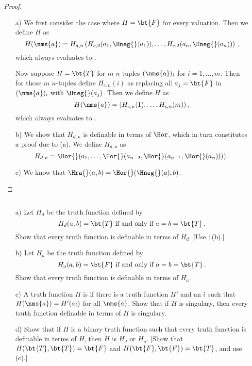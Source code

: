 
\begin{proof}
	\begin{enumerate}
		\item[a)] We first consider the case where $H = \bt{F}$ for 
		every valuation. Then we define $H$ as
		\[
			H(\nms{a}) = H_{d,n} \left( H_{c,2}(a_1,\Hneg{}(a_1)), 
			\dots, H_{c,2}(a_n,\Hneg{}(a_n)) \right)\,,
		\]
		which always evaluates to .
		
		Now suppose $H = \bt{T}$ for $m$ $n$-tuples $(\nms{a})_i$ 
		for $i = 1, \dots, m$. Then for those $m$ $n$-tuples define 
		$H_{c,n}(i)$ as replacing all $a_j = \bt{F}$ in 
		$(\nms{a})_i$ with $\Hneg{}(a_j)$. Then we define $H$ as
		\[
			H(\nms{a}) = (H_{c,n}(1), \dots, H_{c,n}(m))\,,
		\]
		which always evaluates to .
		
		\item[b)] We show that $H_{d,n}$ is definable in terms of 
		$\Hor$, which in turn constitutes a proof due to (a). We 
		define $H_{d,n}$ as
		\[
			H_{d,n} = 
			\Hor{}(a_1, \dots, \Hor{}(a_{n-2},\Hor{}(a_{n-1}, 
			\Hor{}(a_n))))\,.
		\]
		
		\item[c)] We know that $\Hra{}(a,b) = 
		\Hor{}(\Hneg{}(a),b)$.
	\end{enumerate}
\end{proof}


\begin{exercise}
	$ $
	\begin{enumerate}
		\item[a)] Let $H_d$ be the truth function defined by
		\[
			H_d(a,b) = \bt{T} \text{ if and only if } a = b = 
			\bt{T}\,.
		\]
		Show that every truth function is definable in terms of 
		$H_d$. [Use 1(b).]
		
		\item[b)] Let $H_a$ be the truth function defined by
		\[
			H_a(a,b) = \bt{F} \text{ if and only if } a = b = 
			\bt{T}\,.
		\]
		Show that every truth function is definable in terms of 
		$H_a$.
		
		\item[c)] A truth function $H$ is  if there 
		is a truth function $H'$ and an $i$ such that $H(\nms{a}) = 
		H'(a_i)$ for all $\nms{a}$. Show that if $H$ is singulary, 
		then every truth function definable in terms of $H$ is 
		singulary.
		
		\item[d)] Show that if $H$ is a binary truth function such 
		that every truth function is definable in terms of $H$, 
		then $H$ is $H_d$ or $H_a$. [Show that $H(\bt{T}, \bt{T}) = 
		\bt{F}$ and $H(\bt{F},\bt{F}) = \bt{T}$, and use (c).]
	\end{enumerate}
\end{exercise}

